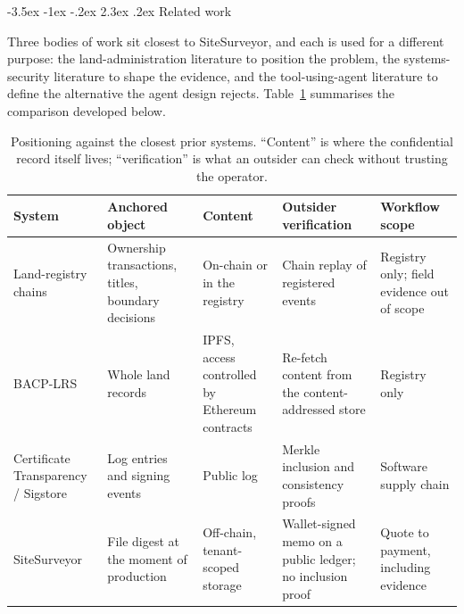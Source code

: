 \documentclass[10pt,a4paper,twocolumn]{article}
\makeatletter
\renewcommand\section{\@startsection{section}{1}{\z@}
  {-3.5ex \@plus -1ex \@minus -.2ex}
  {2.3ex \@plus.2ex}
  {\normalfont\Large\bfseries\hyphenpenalty=10000\exhyphenpenalty=10000}}
\makeatother
\begin{document}
\section{Related work}
\label{sec:related}

Three bodies of work sit closest to SiteSurveyor, and each is used for a different
purpose: the land-administration literature to position the problem, the systems-security
literature to shape the evidence, and the tool-using-agent literature to define the
alternative the agent design rejects. Table~\ref{tab:related} summarises the comparison
developed below.

\begin{table}[t]
\centering
\caption{Positioning against the closest prior systems. ``Content'' is where the
confidential record itself lives; ``verification'' is what an outsider can check
without trusting the operator.}
\label{tab:related}
\small
\setlength{\tabcolsep}{4pt}
\begin{tabular}{@{}>{\raggedright\arraybackslash}p{}
  >{\raggedright\arraybackslash}p{}
  >{\raggedright\arraybackslash}p{}
  >{\raggedright\arraybackslash}p{}
  >{\raggedright\arraybackslash}p{}@{}}
\toprule
System & Anchored object & Content & Outsider verification & Workflow scope \\
\midrule
Land-registry chains \cite{zein2023,sladic2021,torun2018} &
  Ownership transactions, titles, boundary decisions &
  On-chain or in the registry &
  Chain replay of registered events &
  Registry only; field evidence out of scope \\
BACP-LRS \cite{boumezbeur2025} &
  Whole land records &
  IPFS, access controlled by Ethereum contracts &
  Re-fetch content from the content-addressed store &
  Registry only \\
Certificate Transparency / Sigstore \cite{rfc6962,sigstore2025} &
  Log entries and signing events &
  Public log &
  Merkle inclusion and consistency proofs &
  Software supply chain \\
SiteSurveyor &
  File digest at the moment of production &
  Off-chain, tenant-scoped storage &
  Wallet-signed memo on a public ledger; no inclusion proof &
  Quote to payment, including evidence \\
\bottomrule
\end{tabular}
\end{table}
\end{document}
